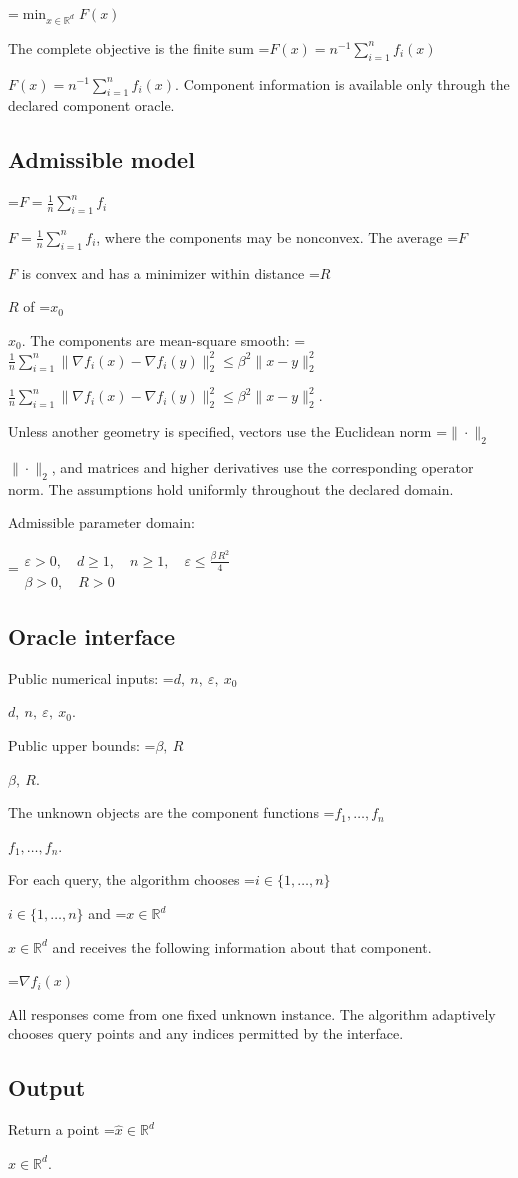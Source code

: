 \documentclass[10pt,a4paper]{article}
\newcommand{\AtlasMath}[1]{\par\begingroup\centering\setbox0=\hbox{$\displaystyle #1$}\ifdim\wd0>1.4\linewidth\typeout{ATLAS WIDE FORMULA: \the\wd0}\fi\ifdim\wd0>\linewidth\resizebox{\linewidth}{!}{\box0}\else\box0\fi\par\endgroup}
\newcommand{\AtlasInlineMath}[1]{\begingroup\setbox0=\hbox{$#1$}\ifdim\wd0>.4\linewidth\endgroup\AtlasMath{#1}\else\endgroup$#1$\fi}
\begin{document}
\AtlasMath{\min_{x\in \mathbb{R}^d}F(x)}


The complete objective is the finite sum \AtlasInlineMath{F(x)=n^{-1}\sum_{i=1}^n f_i(x)}. Component information is available only through the declared component oracle.

\subsection{Admissible model}
\AtlasInlineMath{F=\frac1n\sum_{i=1}^n f_i}, where the components may be nonconvex. The average \AtlasInlineMath{F} is convex and has a minimizer within distance \AtlasInlineMath{R} of \AtlasInlineMath{x_0}. The components are mean-square smooth: \AtlasInlineMath{\frac1n\sum_{i=1}^n\|\nabla f_i(x)-\nabla f_i(y)\|_2^2\le\beta^2\|x-y\|_2^2}.

Unless another geometry is specified, vectors use the Euclidean norm \AtlasInlineMath{\|\cdot\|_2}, and matrices and higher derivatives use the corresponding operator norm. The assumptions hold uniformly throughout the declared domain.

Admissible parameter domain:


\AtlasMath{\begin{gathered}\varepsilon > 0,\quad d \ge 1,\quad n \ge 1,\quad \varepsilon \le \frac{\beta\,{R}^{2}}{4}\\\beta > 0,\quad R > 0\end{gathered}}


\subsection{Oracle interface}
Public numerical inputs: \AtlasInlineMath{d,\ n,\ \varepsilon,\ x_0}.

Public upper bounds: \AtlasInlineMath{\beta,\ R}.

The unknown objects are the component functions \AtlasInlineMath{f_1,\ldots,f_n}.

For each query, the algorithm chooses \AtlasInlineMath{i\in\{1,\ldots,n\}} and \AtlasInlineMath{x\in\mathbb R^d} and receives the following information about that component.


\AtlasMath{\nabla f_i(x)}


All responses come from one fixed unknown instance. The algorithm adaptively chooses query points and any indices permitted by the interface.

\subsection{Output}
Return a point \AtlasInlineMath{\widehat x\in\mathbb R^d}.
\end{document}
